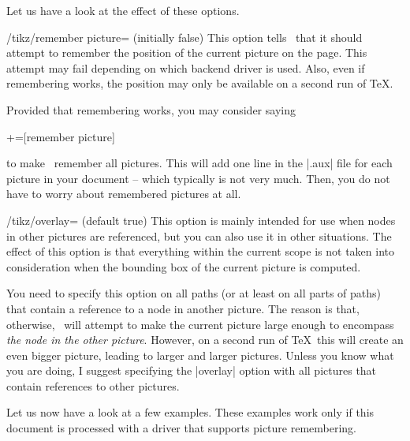 Let us have a look at the effect of these options.
\begin{key}{/tikz/remember picture= (initially false)}
  This option tells \tikzname\ that it should attempt to remember the
  position of the current picture on the page. This attempt may fail
  depending on which backend driver is used. Also, even if remembering
  works, the position may only be available on a second run of \TeX.

  Provided that remembering works, you may consider saying
\begin{codeexample}
+=[remember picture]
\end{codeexample}
  to make \tikzname\ remember all pictures. This will add one line in
  the |.aux| file for each picture in your document -- which typically
  is not very much. Then, you do not have to worry about remembered
  pictures at all.
\end{key}

\begin{key}{/tikz/overlay= (default true)}
  This option is mainly intended for use when nodes in other pictures
  are referenced, but you can also use it in other situations. The
  effect of this option is that everything within the current scope is
  not taken into consideration when the bounding box of the current
  picture is computed.

  You need to specify this option on all paths (or at least on all
  parts of paths) that contain a reference to a node in another
  picture. The reason is that, otherwise, \tikzname\ will attempt to
  make the current picture large enough to encompass \emph{the node in
    the other picture}. However, on a second run of \TeX\ this will
  create an even bigger picture, leading to larger and larger
  pictures. Unless you know what you are doing, I suggest specifying
  the |overlay| option with all pictures that contain references to
  other pictures.
\end{key}

Let us now have a look at a few examples. These examples work only if
this document is processed with a driver that supports picture
remembering.
\medskip

